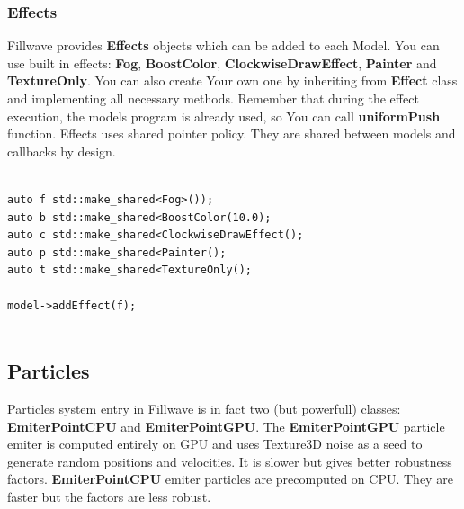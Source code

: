 \documentclass{article}
\begin{document}
\subsubsection{Effects}\label{sec:Effects}
\indent \indent Fillwave provides \textbf{Effects} objects which can be added to each Model. You can use built in effects: \textbf{Fog}, \textbf{BoostColor}, \textbf{ClockwiseDrawEffect}, \textbf{Painter} and \textbf{TextureOnly}. You can also create Your own one by inheriting from \textbf{Effect} class and implementing all necessary methods. Remember that during the effect execution, the models program is already used, so You can call \textbf{uniformPush} function. Effects uses shared pointer policy. They are shared between models and callbacks by design.

\begin{lstlisting}

auto f std::make_shared<Fog>());
auto b std::make_shared<BoostColor(10.0);
auto c std::make_shared<ClockwiseDrawEffect();
auto p std::make_shared<Painter();
auto t std::make_shared<TextureOnly();

model->addEffect(f);
   
\end{lstlisting}

\subsection{Particles}\label{sec:Particles}
\indent \indent Particles system entry in Fillwave is in fact two (but powerfull) classes: \textbf{EmiterPointCPU} and \textbf{EmiterPointGPU}. The \textbf{EmiterPointGPU} particle emiter is computed entirely on GPU and uses Texture3D noise as a seed to generate random positions and velocities. It is slower but gives better robustness factors. \textbf{EmiterPointCPU} emiter particles are precomputed on CPU. They are faster but the factors are less robust.
\end{document}
